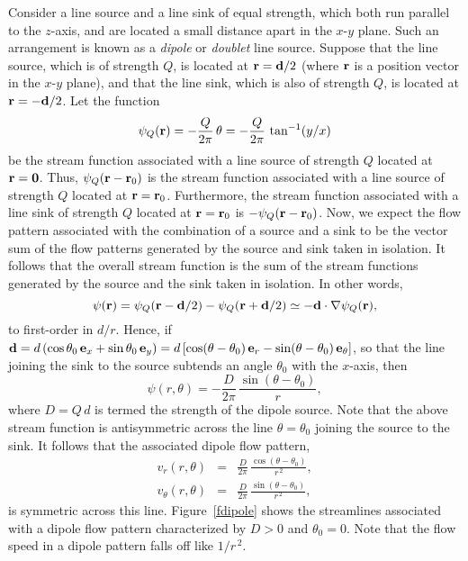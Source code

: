 Consider a line source and a line sink of equal strength, which  both run parallel to the
$z$-axis, and are located a small distance apart in the $x$-$y$ plane. Such an arrangement
is known as a  {\em dipole}\/ or  {\em doublet}\/ line source. Suppose that the  line source, which is of strength $Q$, is located
at ${\bf r}={\bf d}/2$ (where ${\bf r}$ is a position vector in the $x$-$y$ plane), and that the  line sink, which is also of strength $Q$, is located at ${\bf r}=-{\bf d}/2$. 
Let the function 
\begin{equation}
\psi_Q({\bf r})= -\frac{Q}{2\pi}\,\theta =- \frac{Q}{2\pi}\,\tan^{-1}(y/x)
\end{equation}
 be the stream function associated with a  line source of strength $Q$ located at ${\bf r}={\bf 0}$. 
 Thus, $\psi_Q({\bf r}-{\bf r}_0)$ is the  stream function associated with a  line source of strength $Q$ located at ${\bf r}={\bf r}_0$. 
Furthermore, the stream function associated with a  line sink of strength $Q$ located at ${\bf r}={\bf r}_0$
is $-\psi_Q({\bf r}-{\bf r}_0)$. Now, we expect the flow pattern associated with the combination of a source and a sink to be the vector
sum of the flow patterns generated by the source and sink taken in isolation. It follows that the overall stream function
is the sum of the stream functions generated by the source and the sink taken in isolation. In other words,
\begin{equation}
\psi({\bf r}) = \psi_Q({\bf r}-{\bf d}/2)-\psi_Q({\bf r}+{\bf d}/2)\simeq - {\bf d}\cdot\nabla\psi_Q({\bf r}),
\end{equation}
to first-order in $d/r$. Hence, if ${\bf d} = d\,(\cos\theta_0\,{\bf e}_x+ \sin\theta_0\,{\bf e}_y)=d\,[\cos(\theta-\theta_0)\,{\bf e}_r
-\sin(\theta-\theta_0)\,{\bf e}_\theta]$,
so that the line joining the sink to the source subtends an angle $\theta_0$ with the $x$-axis, 
 then
\begin{equation}
\psi(r,\theta) = -\frac{D}{2\pi}\,\frac{\sin(\theta-\theta_0)}{r},
\end{equation}
where $D=Q\,d$ is termed the strength of the dipole source. Note that the above stream function is antisymmetric
across the line $\theta=\theta_0$ joining the source to the sink. It follows that the
associated dipole flow pattern,
\begin{eqnarray}
v_r(r,\theta)&=& \frac{D}{2\pi}\,\frac{\cos(\theta-\theta_0)}{r^{\,2}},\\[0.5ex]
v_\theta(r,\theta)&=&\frac{D}{2\pi}\,\frac{\sin(\theta-\theta_0)}{r^{\,2}},
\end{eqnarray}
 is symmetric across this line. Figure~\ref{fdipole} shows the streamlines associated with a dipole flow
 pattern characterized by $D>0$ and $\theta_0=0$. Note that the flow speed in a dipole
 pattern falls off like $1/r^{\,2}$. 

